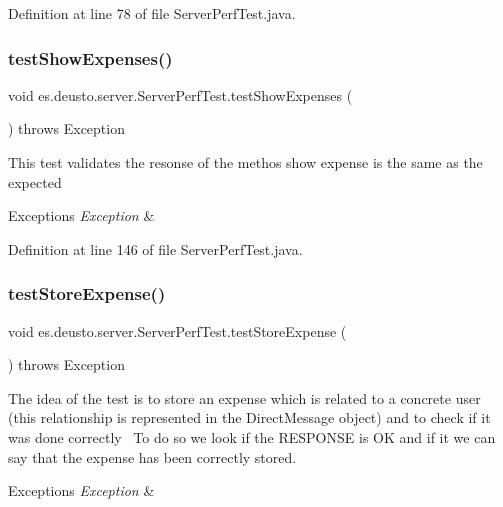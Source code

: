 Definition at line 78 of file Server\+Perf\+Test.\+java.

\mbox{\label{classes_1_1deusto_1_1server_1_1_server_perf_test_a823b0fc7575feded84e73dc929a32399}} 
\subsubsection{\texorpdfstring{test\+Show\+Expenses()}{testShowExpenses()}}
{\footnotesize\ttfamily void es.\+deusto.\+server.\+Server\+Perf\+Test.\+test\+Show\+Expenses (\begin{DoxyParamCaption}{ }\end{DoxyParamCaption}) throws Exception}

This test validates the resonse of the methos show expense is the same as the expected 
\begin{DoxyExceptions}{Exceptions}
{\em Exception} & \\
\hline
\end{DoxyExceptions}


Definition at line 146 of file Server\+Perf\+Test.\+java.

\mbox{\label{classes_1_1deusto_1_1server_1_1_server_perf_test_a1d4685eb157c172ece9a6ef9ba302696}} 
\subsubsection{\texorpdfstring{test\+Store\+Expense()}{testStoreExpense()}}
{\footnotesize\ttfamily void es.\+deusto.\+server.\+Server\+Perf\+Test.\+test\+Store\+Expense (\begin{DoxyParamCaption}{ }\end{DoxyParamCaption}) throws Exception}

The idea of the test is to store an expense which is related to a concrete user (this relationship is represented in the Direct\+Message object) and to check if it was done correctly~\newline
To do so we look if the R\+E\+S\+P\+O\+N\+SE is OK and if it we can say that the expense has been correctly stored. 
\begin{DoxyExceptions}{Exceptions}
{\em Exception} & \\
\hline
\end{DoxyExceptions}


